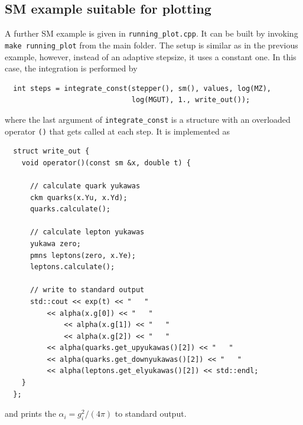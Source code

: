 \documentclass[preprint,12pt]{elsarticle}
\begin{document}
\subsection{\label{sec::sm_plot_example} SM example suitable for plotting}
A further SM example is given in \texttt{running\_plot.cpp}. It can be built by invoking \texttt{make running\_plot} from the main folder.
The setup is similar as in the previous example, however, instead of an adaptive stepsize, it uses a constant one.
In this case, the integration is performed by
\begin{lstlisting}
  int steps = integrate_const(stepper(), sm(), values, log(MZ),
                              log(MGUT), 1., write_out());
\end{lstlisting}
where the last argument of \texttt{integrate\_const} is a structure with an overloaded operator \texttt{()} that gets called at each step.
It is implemented as
\begin{lstlisting}
  struct write_out {
    void operator()(const sm &x, double t) {

      // calculate quark yukawas
      ckm quarks(x.Yu, x.Yd);
      quarks.calculate();

      // calculate lepton yukawas
      yukawa zero;
      pmns leptons(zero, x.Ye);
      leptons.calculate();
    
      // write to standard output
      std::cout << exp(t) << "   "
	      << alpha(x.g[0]) << "   "
      	      << alpha(x.g[1]) << "   "
      	      << alpha(x.g[2]) << "   "
	      << alpha(quarks.get_upyukawas()[2]) << "   "
	      << alpha(quarks.get_downyukawas()[2]) << "   "
	      << alpha(leptons.get_elyukawas()[2]) << std::endl;
    }
  };
\end{lstlisting}
and prints the $\alpha_i = g_i^2/\left(4\pi\right)$ to standard output.
\end{document}
